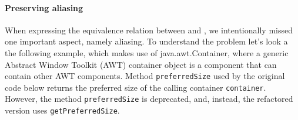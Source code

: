 \documentclass[sigconf,review,anonymous]{acmart}
\begin{document}

\paragraph{Preserving aliasing}

When expressing the equivalence relation between  and , we
intentionally missed one important aspect, namely aliasing.  To understand
the problem let's look a the following example, which makes use of
java.awt.Container, where a generic Abstract Window Toolkit (AWT) container
object is a component that can contain other AWT components.  Method
\texttt{preferredSize} used by the original code below returns the preferred
size of the calling container \texttt{container}.  However, the method
\texttt{preferredSize} is deprecated, and, instead, the refactored version
uses \texttt{getPreferredSize}.

\end{document}

